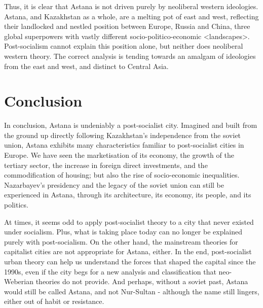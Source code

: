 \documentclass{article}
\begin{document}
Thus, it is clear that Astana is not driven purely by neoliberal western ideologies. Astana, and Kazakhstan as a whole, are a melting pot of east and west, reflecting their landlocked and nestled position between Europe, Russia and China, three global superpowers with vastly different socio-politico-economic <landscapes>. Post-socialism cannot explain this position alone, but neither does neoliberal western theory. The correct analysis is tending towards an amalgam of ideologies from the east and west, and distinct to Central Asia.

\section{Conclusion}

In conclusion, Astana is undeniably a post-socialist city. Imagined and built from the ground up directly following Kazakhstan's independence from the soviet union, Astana exhibits many characteristics familiar to post-socialist cities in Europe. We have seen the marketisation of its economy, the growth of the tertiary sector, the increase in foreign direct investments, and the commodification of housing; but also the rise of socio-economic inequalities. Nazarbayev's presidency and the legacy of the soviet union can still be experienced in Astana, through its architecture, its economy, its people, and its politics.

At times, it seems odd to apply post-socialist theory to a city that never existed under socialism. Plus, what is taking place today can no longer be explained purely with post-socialism. On the other hand, the mainstream theories for capitalist cities are not appropriate for Astana, either.
In the end, post-socialist urban theory can help us understand the forces that shaped the capital since the 1990s, even if the city begs for a new analysis and classification that neo-Weberian theories do not provide.
And perhaps, without a soviet past, Astana would still be called Astana, and not Nur-Sultan - although the name still lingers, either out of habit or resistance.

\pagebreak

\printbibliography
\end{document}

